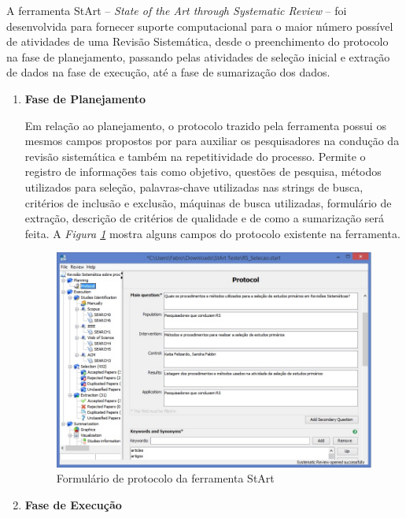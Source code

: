 A ferramenta StArt -- \textit{State of the Art through Systematic Review} \cite{fabbri2013} -- foi desenvolvida para fornecer suporte computacional para o maior número possível de atividades de uma Revisão Sistemática, desde o preenchimento do protocolo na fase de planejamento, passando pelas atividades de seleção inicial e extração de dados na fase de execução, até a fase de sumarização dos dados.

\begin{enumerate}

    \item \textbf{Fase de Planejamento}
    
    Em relação ao planejamento, o protocolo trazido pela ferramenta possui os mesmos campos propostos por \citet{Kitchenham2011} para auxiliar os pesquisadores na condução da revisão sistemática e também na repetitividade do processo. Permite o registro de informações tais como objetivo, questões de pesquisa, métodos utilizados para seleção, palavras-chave utilizadas nas strings de busca, critérios de inclusão e exclusão, máquinas de busca utilizadas, formulário de extração, descrição de critérios de qualidade e de como a sumarização será feita. A \textit{Figura \ref{Start01}} mostra alguns campos do protocolo existente na ferramenta.
    
    \begin{figure}[!htb]
	\centering
	\includegraphics[scale=0.65]{Capitulo-Apendices/figura/Start01.jpg}
	\caption{Formulário de protocolo da ferramenta StArt}
	\label{Start01}
    \end{figure}
    
    \item \textbf{Fase de Execução}
    

\end{enumerate}
